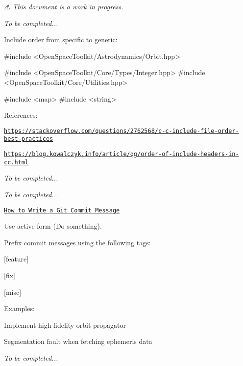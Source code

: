 {\itshape ⚠ This document is a work in progress.}

{\itshape To be completed...}

Include order from specific to generic\+:


\begin{DoxyCode}
\textcolor{preprocessor}{#include <OpenSpaceToolkit/Astrodynamics/Orbit.hpp>}

\textcolor{preprocessor}{#include <OpenSpaceToolkit/Core/Types/Integer.hpp>}
\textcolor{preprocessor}{#include <OpenSpaceToolkit/Core/Utilities.hpp>}

\textcolor{preprocessor}{#include <map>}
\textcolor{preprocessor}{#include <string>}
\end{DoxyCode}


References\+:


\begin{DoxyItemize}
\item \href{https://stackoverflow.com/questions/2762568/c-c-include-file-order-best-practices}{\tt https\+://stackoverflow.\+com/questions/2762568/c-\/c-\/include-\/file-\/order-\/best-\/practices}
\item \href{https://blog.kowalczyk.info/article/qg/order-of-include-headers-in-cc.html}{\tt https\+://blog.\+kowalczyk.\+info/article/qg/order-\/of-\/include-\/headers-\/in-\/cc.\+html}
\end{DoxyItemize}

{\itshape To be completed...}

{\itshape To be completed...}

\href{https://chris.beams.io/posts/git-commit/}{\tt How to Write a Git Commit Message}

Use active form ({\ttfamily Do something}).

Prefix commit messages using the following tags\+:


\begin{DoxyItemize}
\item \mbox{[}feature\mbox{]}
\item \mbox{[}fix\mbox{]}
\item \mbox{[}misc\mbox{]}
\end{DoxyItemize}

Examples\+:


\begin{DoxyCode}
[feature] Implement high fidelity orbit propagator
\end{DoxyCode}



\begin{DoxyCode}
[fix] Segmentation fault when fetching ephemeris data
\end{DoxyCode}


{\itshape To be completed...} 
